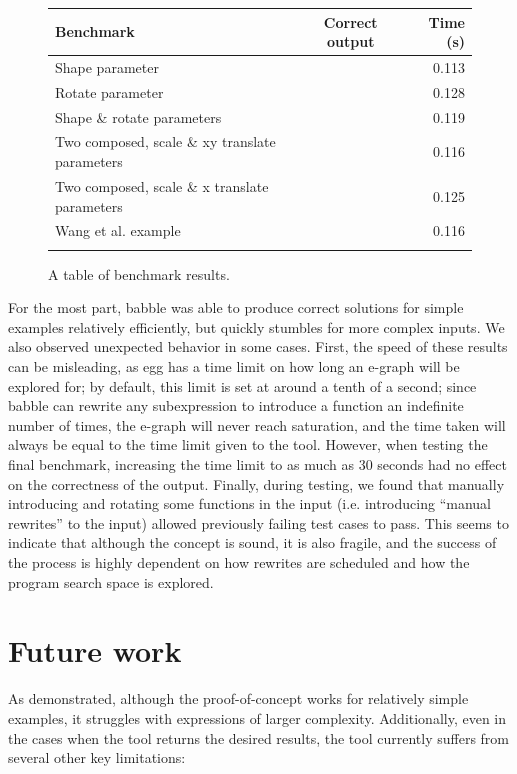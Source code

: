 \documentclass[acmsmall,nonacm]{acmart}\settopmatter{}
\newcommand{\cmark}{\ding{51}}%
\newcommand{\xmark}{\ding{55}}%
\begin{document}
\begin{figure}[h!]
  \begin{tabular}{@{}lcr@{}}
    \toprule
    Benchmark & Correct output & Time (s) \\
    \midrule
    Shape parameter & \cmark & 0.113 \\
    Rotate parameter & \cmark & 0.128 \\
    Shape \& rotate parameters & \cmark & 0.119 \\
    Two composed, scale \& xy translate parameters & \cmark & 0.116 \\
    Two composed, scale \& x translate parameters & \cmark & 0.125 \\
    Wang et al. example & \xmark & 0.116 \\
    \bottomrule
    \abovetopsep
  \end{tabular}

  \caption{A table of benchmark results.}
  \label{fig:3}
\end{figure}

For the most part, babble was able to produce correct solutions for simple examples relatively efficiently, but quickly stumbles for more complex inputs. We also observed unexpected behavior in some cases. First, the speed of these results can be misleading, as egg has a time limit on how long an e-graph will be explored for; by default, this limit is set at around a tenth of a second; since babble can rewrite any subexpression to introduce a function an indefinite number of times, the e-graph will never reach saturation, and the time taken will always be equal to the time limit given to the tool. However, when testing the final benchmark, increasing the time limit to as much as 30 seconds had no effect on the correctness of the output. Finally, during testing, we found that manually introducing and rotating some functions in the input (i.e. introducing ``manual rewrites'' to the input) allowed previously failing test cases to pass. This seems to indicate that although the concept is sound, it is also fragile, and the success of the process is highly dependent on how rewrites are scheduled and how the program search space is explored.

\section{Future work}

As demonstrated, although the proof-of-concept works for relatively simple examples, it struggles with expressions of larger complexity. Additionally, even in the cases when the tool returns the desired results, the tool currently suffers from several other key limitations:
\end{document}
